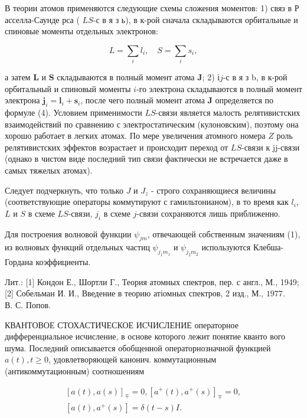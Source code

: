 \documentclass[10pt]{article}
\begin{document}
В теории атомов применяются следующие схемы сложения моментов: 1) связ в Р асселла-Саунде рса ( $L S$-с в я з ь), в к-рой сначала складываются орбитальные и спиновые моменты отдельных электронов:



\[

L=\sum_{i} l_{i}, \quad S=\sum_{i} s_{i},

\]



а затем $\boldsymbol{L}$ и $\boldsymbol{S}$ складываются в полный момент атома $\boldsymbol{J}$; 2) $і j$-с в я з b, в к-рой орбитальный и спиновый моменты $i$-го электрона складываются в полный момент электрона $\boldsymbol{j}_{i}=\boldsymbol{l}_{i}+\boldsymbol{s}_{i}$, после чего полный момент атома $\boldsymbol{J}$ определяется по формуле (4). Условием применимости $L S$-связи является малость релятивистских взаимодействий по сравнению с электростатическим (кулоновским), поэтому она хорошо работает в легких атомах. По мере увеличения атомного номера $Z$ роль релятивистских эффектов возрастает и происходит переход от $L S$-связи к jj-связи (однако в чистом виде последний тип связи фактически не встречается даже в самых тяжелых атомах).



Следует подчеркнуть, что только $J$ и $J_{z}$ - строго сохраняющиеся величины (соответствующие операторы коммутируют с гамильтонианом), в то время как $l_{i}$, $L$ и $S$ в схеме $L S$-связи, $j_{i}$ в схеме $j$-связи сохраняются лишь приближенно.



Для построения волновой функции $\psi_{j m}$, отвечающей собственным значениям (1), из волновых функций отдельных частиц $\psi_{j_{1} m_{1}}$ и $\psi_{j_{2} m_{2}}$ используются Клебша-Гордана коэффициенты.



Лит.: [1] Кондон Е., Шортли Г., Теория атомных спектров, пер. с англ., М., 1949; [2] Собельман И. И., Введение в теорию атіомных спектров, 2 изд., М., $1977 . \quad$ В. С. Попов.



КВАНТОВОЕ СТОХАСТИЧЕСКОЕ ИСЧИСЛЕНИЕ операторное дифференциальное исчисление, в основе которого лежит понятие кванто вого шума. Последний описывается обобщенной операторнозначной функцией $a(t), t \geqslant 0$, удовлетворяющей канонич. коммутационным (антикоммутационным) соотношениям



\[

\begin{gathered}

{[a(t), a(s)]_{\mp}=0,\left[a^{+}(t), a^{+}(s)\right]_{\mp}=0,} \\

{\left[a(t), a^{+}(s)\right]=\delta(t-s) I .}

\end{gathered}

\]
\end{document}
